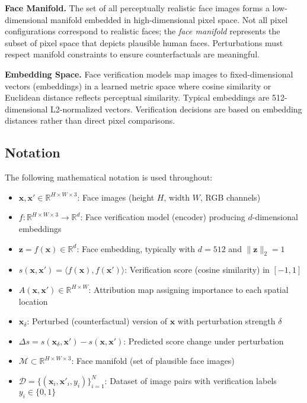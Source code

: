 \textbf{Face Manifold.} The set of all perceptually realistic face images forms a low-dimensional manifold embedded in high-dimensional pixel space. Not all pixel configurations correspond to realistic faces; the \emph{face manifold} represents the subset of pixel space that depicts plausible human faces. Perturbations must respect manifold constraints to ensure counterfactuals are meaningful.

\textbf{Embedding Space.} Face verification models map images to fixed-dimensional vectors (embeddings) in a learned metric space where cosine similarity or Euclidean distance reflects perceptual similarity. Typical embeddings are 512-dimensional L2-normalized vectors. Verification decisions are based on embedding distances rather than direct pixel comparisons.

\subsection{Notation}

The following mathematical notation is used throughout:

\begin{itemize}
\item $\mathbf{x}, \mathbf{x}' \in \mathbb{R}^{H \times W \times 3}$: Face images (height $H$, width $W$, RGB channels)
\item $f: \mathbb{R}^{H \times W \times 3} \to \mathbb{R}^d$: Face verification model (encoder) producing $d$-dimensional embeddings
\item $\mathbf{z} = f(\mathbf{x}) \in \mathbb{R}^d$: Face embedding, typically with $d=512$ and $\|\mathbf{z}\|_2 = 1$
\item $s(\mathbf{x}, \mathbf{x}') = \langle f(\mathbf{x}), f(\mathbf{x}') \rangle$: Verification score (cosine similarity) in $[-1, 1]$
\item $A(\mathbf{x}, \mathbf{x}') \in \mathbb{R}^{H \times W}$: Attribution map assigning importance to each spatial location
\item $\mathbf{x}_\delta$: Perturbed (counterfactual) version of $\mathbf{x}$ with perturbation strength $\delta$
\item $\Delta s = s(\mathbf{x}_\delta, \mathbf{x}') - s(\mathbf{x}, \mathbf{x}')$: Predicted score change under perturbation
\item $\mathcal{M} \subset \mathbb{R}^{H \times W \times 3}$: Face manifold (set of plausible face images)
\item $\mathcal{D} = \{(\mathbf{x}_i, \mathbf{x}'_i, y_i)\}_{i=1}^N$: Dataset of image pairs with verification labels $y_i \in \{0,1\}$
\end{itemize}

